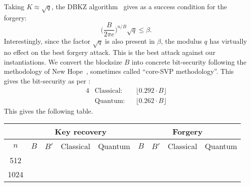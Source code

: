 Taking $K\approx \sqrt{q}$, the DBKZ algorithm~\cite[Corollary 2]{EC:MicWal16} gives as a success condition for 
the forgery: %
\begin{equation}\label{eq:blocksize_forgery}
\bigg(\frac{B}{2\pi e}\bigg)^{n/B} \sqrt{q} \leq \beta.
\end{equation}
Interestingly, since the factor $\sqrt{q}$ is also present in $\beta$, the modulus $q$ has virtually no effect on the best forgery attack. This is the best attack against our instantiations.
We convert the blocksize $B$ into concrete bit-security following the methodology of 
New Hope~\cite{USENIX:ADPS16}, sometimes called ``core-SVP methodology''. 
This gives the  bit-security as per \cite{SODA:BDGL16,Laarhoven16}:
\begin{alignat}{4}
	&\text{Classical:} && \lfloor 0.292 \cdot B \rfloor \label{eq:sec_classic} \\
	&\text{Quantum:} && \lfloor 0.262 \cdot B \rfloor \label{eq:sec_quantum}	
\end{alignat}
This gives the following table.
%


\begin{center}
	\begin{tabular}{||c|cc| c c|cc| c c||}
		\hline
		& \multicolumn{4}{c|}{Key recovery} & \multicolumn{4}{c||}{Forgery} \\
		\hline
		$n$ & $B$ & $B'$ & Classical & Quantum & $B$ & $B'$ & Classical & Quantum \\
		\hline
		512 & \keyrecbkzi & \keyrecsievei & \keyrecclassici & \keyrecquantumi & \forgebkzi & \forgesievei & \forgeclassici & \forgequantumi \\
		1024 & \keyrecbkzv & \keyrecsievev & \keyrecclassicv & \keyrecquantumv & \forgebkzv & \forgesievev & \forgeclassicv & \forgequantumv \\
		\hline
	\end{tabular}
\end{center}


